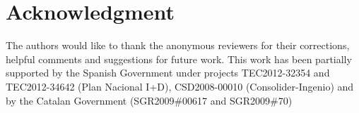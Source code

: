 \documentclass[conference]{IEEEtran}
\newcommand{\Az}[1]{{\color{black}{#1}}}
\begin{document}


%




\section*{Acknowledgment}

The authors would like to thank the anonymous reviewers for their corrections, helpful comments and suggestions for future work.
This work has been partially supported by the Spanish Government under projects TEC2012-32354 and TEC2012-34642 (Plan Nacional I+D), CSD2008-00010 (Consolider-Ingenio) and by the Catalan Government (SGR2009\#00617 and SGR2009\#70)





\end{document}
